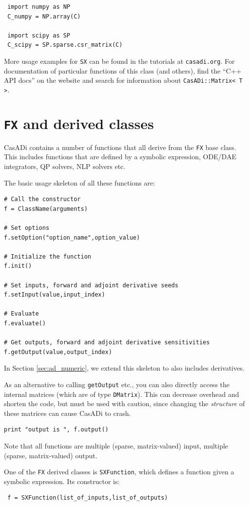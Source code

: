 \documentclass[a4paper,12pt]{book}
\begin{document}
{\begin{verbatim}
 import numpy as NP
 C_numpy = NP.array(C)

 import scipy as SP
 C_scipy = SP.sparse.csr_matrix(C)
\end{verbatim}

More usage examples for \texttt{SX} can be found in the tutorials at \texttt{casadi.org}. For documentation of particular functions of this class (and others), find the ``C++ API docs'' on the website and search for information about \texttt{CasADi::Matrix<\,T\,>}.

\section{\texttt{FX} and derived classes} \label{sec:fx}
CasADi contains a number of functions that all derive from the \texttt{FX} base class. This includes functions that are defined by a symbolic expression, ODE/DAE integrators, QP solvers, NLP solvers etc.

The basic usage skeleton of all these functions are:
\begin{verbatim}
# Call the constructor
f = ClassName(arguments)

# Set options
f.setOption("option_name",option_value)

# Initialize the function
f.init()

# Set inputs, forward and adjoint derivative seeds
f.setInput(value,input_index)

# Evaluate
f.evaluate()

# Get outputs, forward and adjoint derivative sensitivities
f.getOutput(value,output_index)
\end{verbatim}

In Section \ref{sec:ad_numeric}, we extend this skeleton to also includes derivatives.

As an alternative to calling \texttt{getOutput} etc., you can also directly access the internal matrices (which are of type \texttt{DMatrix}). This can decrease overhead and shorten the code, but must be used with caution, since changing the \emph{structure} of these matrices can cause CasADi to crash.
\begin{verbatim}
print "output is ", f.output()
\end{verbatim}

Note that all functions are multiple (sparse, matrix-valued) input, multiple (sparse, matrix-valued) output.

One of the \texttt{FX} derived classes is \texttt{SXFunction}, which defines a function given a symbolic expression. Its constructor is:
\begin{verbatim}
 f = SXFunction(list_of_inputs,list_of_outputs)
\end{verbatim}

}
\end{document}
